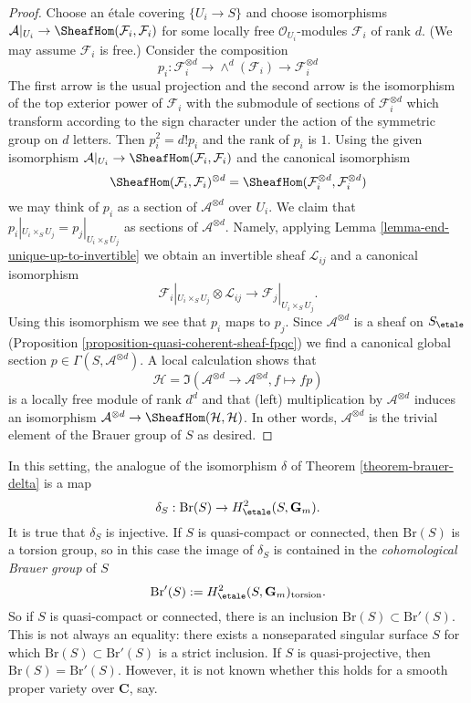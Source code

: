 \begin{proof}
Choose an \'etale covering $\{U_i \to S\}$ and choose isomorphisms
$\mathcal{A}|_{U_i} \to \SheafHom(\mathcal{F}_i, \mathcal{F}_i)$
for some locally free $\mathcal{O}_{U_i}$-modules $\mathcal{F}_i$
of rank $d$. (We may assume $\mathcal{F}_i$ is free.) Consider the
composition
$$
p_i : \mathcal{F}_i^{\otimes d} \to
\wedge^d(\mathcal{F}_i) \to \mathcal{F}_i^{\otimes d}
$$
The first arrow is the usual projection and the second arrow is
the isomorphism of the top exterior power of $\mathcal{F}_i$ with
the submodule of sections of $\mathcal{F}_i^{\otimes d}$ which transform
according to the sign character under the action of the symmetric group
on $d$ letters. Then $p_i^2 = d! p_i$ and the rank of $p_i$ is $1$.
Using the given isomorphism
$\mathcal{A}|_{U_i} \to \SheafHom(\mathcal{F}_i, \mathcal{F}_i)$
and the canonical isomorphism
$$
\SheafHom(\mathcal{F}_i, \mathcal{F}_i)^{\otimes d} =
\SheafHom(\mathcal{F}_i^{\otimes d}, \mathcal{F}_i^{\otimes d})
$$
we may think of $p_i$ as a section of $\mathcal{A}^{\otimes d}$
over $U_i$. We claim that $p_i|_{U_i \times_S U_j} = p_j|_{U_i \times_S U_j}$
as sections of $\mathcal{A}^{\otimes d}$. Namely, applying
Lemma \ref{lemma-end-unique-up-to-invertible}
we obtain an invertible sheaf $\mathcal{L}_{ij}$ and a canonical isomorphism
$$
\mathcal{F}_i|_{U_i \times_S U_j} \otimes \mathcal{L}_{ij}
\longrightarrow
\mathcal{F}_j|_{U_i \times_S U_j}.
$$
Using this isomorphism we see that $p_i$ maps to $p_j$.
Since $\mathcal{A}^{\otimes d}$ is a sheaf on $S_\etale$
(Proposition \ref{proposition-quasi-coherent-sheaf-fpqc}) we find a canonical
global section $p \in \Gamma(S, \mathcal{A}^{\otimes d})$. A local calculation
shows that
$$
\mathcal{H} =
\Im(\mathcal{A}^{\otimes d} \to \mathcal{A}^{\otimes d}, f \mapsto fp)
$$
is a locally free module of rank $d^d$ and that (left) multiplication
by $\mathcal{A}^{\otimes d}$ induces an isomorphism
$\mathcal{A}^{\otimes d} \to \SheafHom(\mathcal{H}, \mathcal{H})$.
In other words, $\mathcal{A}^{\otimes d}$ is the trivial element
of the Brauer group of $S$ as desired.
\end{proof}

\noindent
In this setting, the analogue of the isomorphism $\delta$ of
Theorem \ref{theorem-brauer-delta}
is a map
$$
\delta_S: \text{Br}(S) \to H_\etale^2(S, \mathbf{G}_m).
$$
It is true that $\delta_S$ is injective. If $S$ is quasi-compact or
connected, then $\text{Br}(S)$ is a torsion group, so in this case the
image of $\delta_S$ is contained in the {\it cohomological Brauer group} of $S$
$$
\text{Br}'(S) := H_\etale^2(S, \mathbf{G}_m)_\text{torsion}.
$$
So if $S$ is quasi-compact or connected, there is an inclusion $\text{Br}(S)
\subset \text{Br}'(S)$. This is not always an equality: there exists a
nonseparated singular surface $S$ for which $\text{Br}(S) \subset
\text{Br}'(S)$ is a strict inclusion. If $S$ is quasi-projective, then
$\text{Br}(S) = \text{Br}'(S)$. However, it is not known whether this holds for
a smooth proper variety over $\mathbf{C}$, say.




